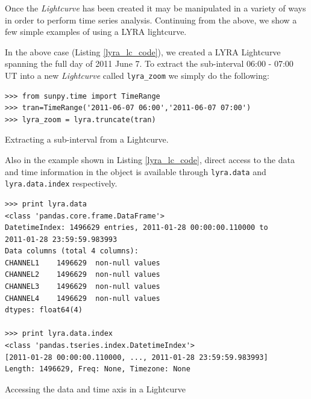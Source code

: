 Once the \textit{Lightcurve} has been created it may be manipulated in a variety of ways in order to perform time series analysis. Continuing from the above, we show a few simple examples of using a LYRA lightcurve. 

In the above case (Listing \ref{lyra_lc_code}), we created a LYRA Lightcurve spanning the full day of 2011 June 7. To extract the sub-interval 06:00 - 07:00 UT into a new \textit{Lightcurve} called \verb|lyra_zoom| we simply do the following:

\begin{listing}[H]
\begin{verbatim}
>>> from sunpy.time import TimeRange
>>> tran=TimeRange('2011-06-07 06:00','2011-06-07 07:00')
>>> lyra_zoom = lyra.truncate(tran)
\end{verbatim}
\label{lyra_truncate}
\caption{Extracting a sub-interval from a Lightcurve.}
\end{listing}

Also in the example shown in Listing \ref{lyra_lc_code}, direct access to the data and time information in the object is available through \verb|lyra.data| and \verb|lyra.data.index| respectively.

\begin{listing}[H]
\begin{verbatim}
>>> print lyra.data
<class 'pandas.core.frame.DataFrame'>
DatetimeIndex: 1496629 entries, 2011-01-28 00:00:00.110000 to 
2011-01-28 23:59:59.983993
Data columns (total 4 columns):
CHANNEL1    1496629  non-null values
CHANNEL2    1496629  non-null values
CHANNEL3    1496629  non-null values
CHANNEL4    1496629  non-null values
dtypes: float64(4)

>>> print lyra.data.index
<class 'pandas.tseries.index.DatetimeIndex'>
[2011-01-28 00:00:00.110000, ..., 2011-01-28 23:59:59.983993]
Length: 1496629, Freq: None, Timezone: None
\end{verbatim}
\label{lyra_pandas}
\caption{Accessing the data and time axis in a Lightcurve}
\end{listing}

